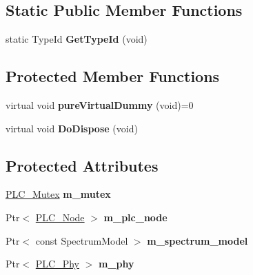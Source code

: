 \subsection*{\-Static \-Public \-Member \-Functions}
\begin{DoxyCompactItemize}
\item 
\hypertarget{classns3_1_1PLC__Interface_a1cdef444d546a3967ea0aee8c4d605a1}{static \-Type\-Id {\bfseries \-Get\-Type\-Id} (void)}\label{classns3_1_1PLC__Interface_a1cdef444d546a3967ea0aee8c4d605a1}

\end{DoxyCompactItemize}
\subsection*{\-Protected \-Member \-Functions}
\begin{DoxyCompactItemize}
\item 
\hypertarget{classns3_1_1PLC__Interface_a142cb310b24853e7cbd6c23c92a8e1bd}{virtual void {\bfseries pure\-Virtual\-Dummy} (void)=0}\label{classns3_1_1PLC__Interface_a142cb310b24853e7cbd6c23c92a8e1bd}

\item 
\hypertarget{classns3_1_1PLC__Interface_a3f004e2e2c1ebce93fa38fe0c7a9d858}{virtual void {\bfseries \-Do\-Dispose} (void)}\label{classns3_1_1PLC__Interface_a3f004e2e2c1ebce93fa38fe0c7a9d858}

\end{DoxyCompactItemize}
\subsection*{\-Protected \-Attributes}
\begin{DoxyCompactItemize}
\item 
\hypertarget{classns3_1_1PLC__Interface_a601610231531a725be13634851a853e6}{\hyperlink{structns3_1_1PLC__Mutex}{\-P\-L\-C\-\_\-\-Mutex} {\bfseries m\-\_\-mutex}}\label{classns3_1_1PLC__Interface_a601610231531a725be13634851a853e6}

\item 
\hypertarget{classns3_1_1PLC__Interface_a1bd242a8f74f65ad8c856bc331a63f20}{\-Ptr$<$ \hyperlink{classns3_1_1PLC__Node}{\-P\-L\-C\-\_\-\-Node} $>$ {\bfseries m\-\_\-plc\-\_\-node}}\label{classns3_1_1PLC__Interface_a1bd242a8f74f65ad8c856bc331a63f20}

\item 
\hypertarget{classns3_1_1PLC__Interface_a3f86b2927a461f43fca67f291f59b37a}{\-Ptr$<$ const \-Spectrum\-Model $>$ {\bfseries m\-\_\-spectrum\-\_\-model}}\label{classns3_1_1PLC__Interface_a3f86b2927a461f43fca67f291f59b37a}

\item 
\hypertarget{classns3_1_1PLC__Interface_ab6a5dc7b7244416f562f1b63eb0079c2}{\-Ptr$<$ \hyperlink{classns3_1_1PLC__Phy}{\-P\-L\-C\-\_\-\-Phy} $>$ {\bfseries m\-\_\-phy}}\label{classns3_1_1PLC__Interface_ab6a5dc7b7244416f562f1b63eb0079c2}

\end{DoxyCompactItemize}


